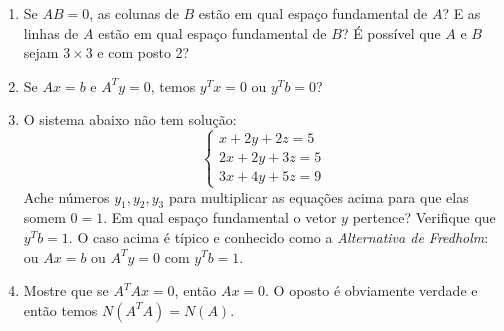 \documentclass[leqno]{article}
\begin{document}
\begin{enumerate}


\item Se $AB = 0$, as colunas de $B$ estão em qual espaço fundamental de $A$? E as linhas de $A$ estão em qual espaço fundamental de $B$? É possível que $A$ e $B$ sejam $3 \times 3$ e com posto 2?

\begin{sol} 
\end{sol} 



\item Se $Ax = b$ e $A^Ty = 0$, temos $y^Tx = 0$ ou $y^Tb=0$?

\begin{sol} 
\end{sol} 



\item O sistema abaixo não tem solução:
$$\begin{cases}
x + 2y + 2z = 5\\
2x + 2y + 3z = 5\\
3x + 4y + 5z = 9
\end{cases}$$
Ache números $y_1,y_2,y_3$ para multiplicar as equações acima para que elas somem $0=1$. Em qual espaço fundamental o vetor $y$ pertence? Verifique que $y^Tb = 1$. O caso acima é típico e conhecido como a \textit{Alternativa de Fredholm}: ou $Ax = b$ ou $A^Ty = 0$ com $y^Tb = 1$.

\begin{sol} 
\end{sol} 



\item Mostre que se $A^TAx = 0$, então $Ax = 0$. O oposto é obviamente verdade e então temos $N(A^TA) = N(A)$.


\end{enumerate}
\end{document}
